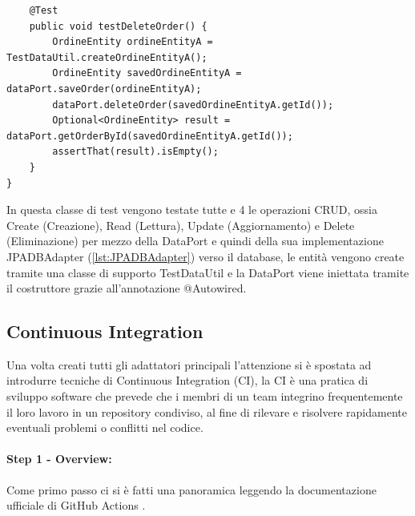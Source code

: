 \begin{lstlisting}
    @Test
    public void testDeleteOrder() {
        OrdineEntity ordineEntityA = TestDataUtil.createOrdineEntityA();
        OrdineEntity savedOrdineEntityA = dataPort.saveOrder(ordineEntityA);
        dataPort.deleteOrder(savedOrdineEntityA.getId());
        Optional<OrdineEntity> result = dataPort.getOrderById(savedOrdineEntityA.getId());
        assertThat(result).isEmpty();
    }
}
\end{lstlisting}
In questa classe di test vengono testate tutte e 4 le operazioni CRUD, ossia Create (Creazione), Read (Lettura), Update (Aggiornamento) e Delete (Eliminazione) per mezzo della DataPort e quindi della sua implementazione JPADBAdapter (\vref{lst:JPADBAdapter}) verso il database, le entità vengono create tramite una classe di supporto TestDataUtil e la DataPort viene iniettata tramite il costruttore grazie all'annotazione @Autowired.


\subsection{Continuous Integration}
Una volta creati tutti gli adattatori principali l'attenzione si è spostata ad introdurre tecniche di Continuous Integration (CI), la CI è una pratica di sviluppo software che prevede che i membri di un team integrino frequentemente il loro lavoro in un repository condiviso, al fine di rilevare e risolvere rapidamente eventuali problemi o conflitti nel codice.
\paragraph{Step 1 - Overview:}
Come primo passo ci si è fatti una panoramica leggendo la documentazione ufficiale di GitHub Actions \cite{ContinuousIntegrationGithubActions}.
